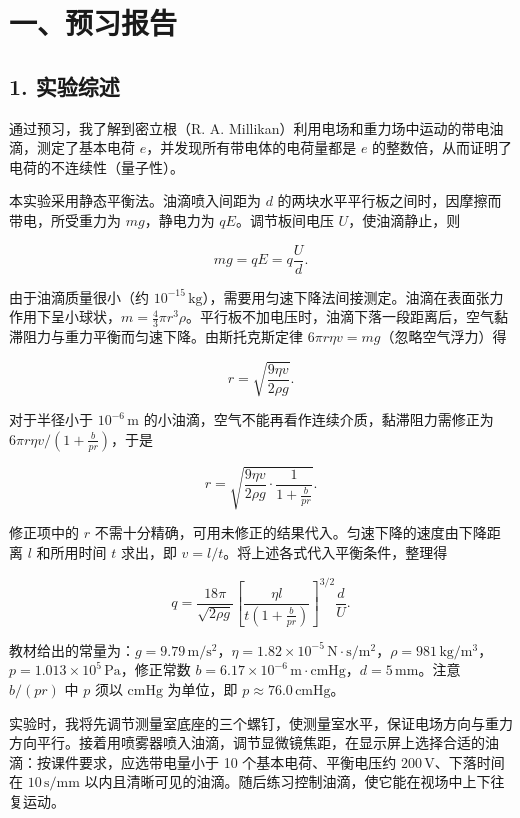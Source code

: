 \section*{一、预习报告}

\subsection*{1. 实验综述}

通过预习，我了解到密立根（R. A. Millikan）利用电场和重力场中运动的带电油滴，测定了基本电荷 $e$，并发现所有带电体的电荷量都是 $e$ 的整数倍，从而证明了电荷的不连续性（量子性）。

本实验采用静态平衡法。油滴喷入间距为 $d$ 的两块水平平行板之间时，因摩擦而带电，所受重力为 $mg$，静电力为 $qE$。调节板间电压 $U$，使油滴静止，则

\[
mg=qE=q\frac{U}{d}.
\]

由于油滴质量很小（约 $10^{-15}\,\mathrm{kg}$），需要用匀速下降法间接测定。油滴在表面张力作用下呈小球状，$m=\frac43\pi r^3\rho$。平行板不加电压时，油滴下落一段距离后，空气黏滞阻力与重力平衡而匀速下降。由斯托克斯定律 $6\pi r\eta v=mg$（忽略空气浮力）得

\[
r=\sqrt{\frac{9\eta v}{2\rho g}}.
\]

对于半径小于 $10^{-6}\,\mathrm{m}$ 的小油滴，空气不能再看作连续介质，黏滞阻力需修正为 $6\pi r\eta v/(1+\frac{b}{pr})$，于是

\[
r=\sqrt{\frac{9\eta v}{2\rho g}\cdot\frac{1}{1+\frac{b}{pr}}}.
\]

修正项中的 $r$ 不需十分精确，可用未修正的结果代入。匀速下降的速度由下降距离 $l$ 和所用时间 $t$ 求出，即 $v=l/t$。将上述各式代入平衡条件，整理得

\[
q=\frac{18\pi}{\sqrt{2\rho g}}\left[\frac{\eta l}{t\left(1+\frac{b}{pr}\right)}\right]^{3/2}\frac{d}{U}.
\]

教材给出的常量为：$g=9.79\,\mathrm{m/s^2}$，$\eta=1.82\times10^{-5}\,\mathrm{N\cdot s/m^2}$，$\rho=981\,\mathrm{kg/m^3}$，$p=1.013\times10^5\,\mathrm{Pa}$，修正常数 $b=6.17\times10^{-6}\,\mathrm{m\cdot cmHg}$，$d=5\,\mathrm{mm}$。注意 $b/(pr)$ 中 $p$ 须以 $\mathrm{cmHg}$ 为单位，即 $p\approx76.0\,\mathrm{cmHg}$。

实验时，我将先调节测量室底座的三个螺钉，使测量室水平，保证电场方向与重力方向平行。接着用喷雾器喷入油滴，调节显微镜焦距，在显示屏上选择合适的油滴：按课件要求，应选带电量小于 10 个基本电荷、平衡电压约 $200\,\mathrm{V}$、下落时间在 $10\,\mathrm{s/mm}$ 以内且清晰可见的油滴。随后练习控制油滴，使它能在视场中上下往复运动。

